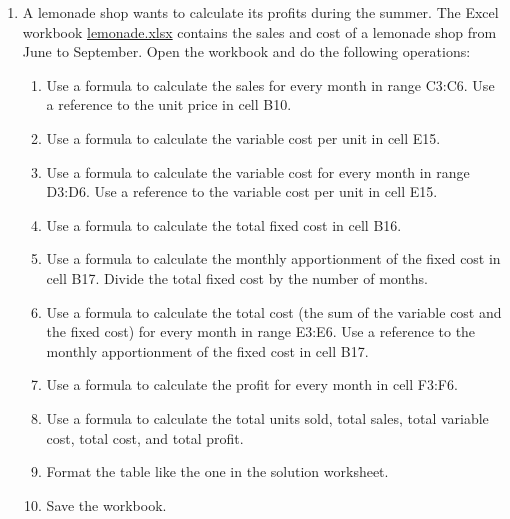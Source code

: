 \begin{enumerate}[leftmargin=*,resume]
\item \label{ex-lemonade}A lemonade shop wants to calculate its profits during the summer.
The Excel workbook \href{http://aprendeconalf.es/office/excel/exercises/formulas/lemonade.xlsx}{\textsf{lemonade.xlsx}}
contains the sales and cost of a lemonade shop from June to September.
Open the workbook and do the following operations:
\begin{enumerate}
\item Use a formula to calculate the sales for every month in range C3:C6.
Use a reference to the unit price in cell B10. 
\item Use a formula to calculate the variable cost per unit in cell E15. 
\item Use a formula to calculate the variable cost for every month in range D3:D6.
Use a reference to the variable cost per unit in cell E15. 
\item Use a formula to calculate the total fixed cost in cell B16.
\item Use a formula to calculate the monthly apportionment of the fixed cost in cell B17.  
Divide the total fixed cost by the number of months.  
\item Use a formula to calculate the total cost (the sum of the variable cost and the fixed cost) for every month in
range E3:E6.
Use a reference to the monthly apportionment of the fixed cost in cell B17. 
\item Use a formula to calculate the profit for every month in cell F3:F6. 
\item Use a formula to calculate the total units sold, total sales, total variable cost, total cost, and total profit. 
\item Format the table like the one in the solution worksheet. 
\item Save the workbook. 
\end{enumerate}



\end{enumerate}
